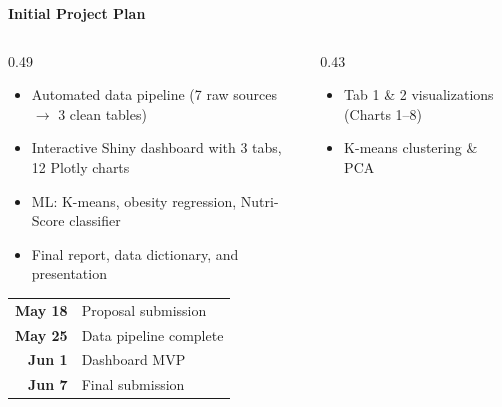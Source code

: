 \documentclass[aspectratio=169, 10pt]{beamer}
\begin{document}
\begin{frame}
\begin{center}
  {\large\bfseries\textcolor{NDarkGreen}{Initial Project Plan}}
\end{center}
\vspace{-4pt}
\begin{columns}[T]
  \begin{column}{0.49\textwidth}
    \begin{tcolorbox}[gbox, title={\footnotesize\bfseries Deliverables},
      coltitle=white, colbacktitle=NGreen]
      \footnotesize
      \begin{itemize}\setlength\itemsep{1pt}
        \item Automated data pipeline (7 raw sources $\to$ 3 clean tables)
        \item Interactive Shiny dashboard with 3 tabs, 12 Plotly charts
        \item ML: K-means, obesity regression, Nutri-Score classifier
        \item Final report, data dictionary, and presentation
      \end{itemize}
    \end{tcolorbox}
    \vspace{2pt}
    \begin{tcolorbox}[ybox, title={\footnotesize\bfseries Timeline},
      coltitle=NBrown, colbacktitle=NYellow!35]
      \footnotesize
      \begin{tabular}{@{}rp{4.5cm}@{}}
        \textbf{May 18} & Proposal submission\\
        \textbf{May 25} & Data pipeline complete\\
        \textbf{Jun 1}  & Dashboard MVP\\
        \textbf{Jun 7}  & Final submission\\
      \end{tabular}
    \end{tcolorbox}
  \end{column}
  \begin{column}{0.43\textwidth}
    \begin{tcolorbox}[gbox, title={\footnotesize\bfseries Nguyen Thi Tra My},
      coltitle=white, colbacktitle=NGreen]
      \footnotesize
      \begin{itemize}\setlength\itemsep{0pt}
        \item Tab 1 \& 2 visualizations (Charts 1--8)
        \item K-means clustering \& PCA

\end{itemize}
\end{tcolorbox}
\end{column}
\end{columns}
\end{frame}
\end{document}
